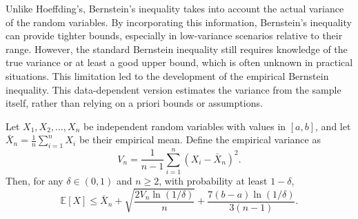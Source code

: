 Unlike Hoeffding's, Bernstein's inequality takes into account the actual variance of the random variables.
By incorporating this information, Bernstein's inequality can provide tighter bounds, especially in low-variance scenarios relative to their range.
However, the standard Bernstein inequality still requires knowledge of the true variance or at least a good upper bound, which is often unknown in practical situations.
This limitation led to the development of the empirical Bernstein inequality.
This data-dependent version estimates the variance from the sample itself, rather than relying on a priori bounds or assumptions.
\begin{proposition}
    Let $X_1, X_2, \ldots, X_n$ be independent random variables with values in $[a,b]$, and let $\bar{X}_n = \frac{1}{n}\sum_{i=1}^n X_i$ be their empirical mean.
    Define the empirical variance as
    \[
        V_n = \frac{1}{n-1} \sum_{i=1}^n (X_i - \bar{X}_n)^2.
    \]
    Then, for any $\delta \in (0,1)$ and $n \geq 2$, with probability at least $1-\delta$,
    \[
        \mathbb{E}[X] \leq \bar{X}_n + \sqrt{\frac{2V_n \ln(1/\delta)}{n}} + \frac{7(b-a)\ln(1/\delta)}{3(n-1)}.
    \]
\end{proposition}
%
%
